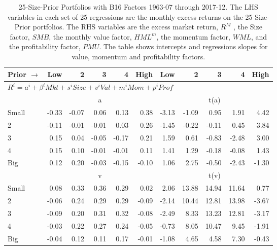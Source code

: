
\begin{table}[!ht]
\footnotesize
\centering
\caption{
\scriptsize{
25-Size-Prior Portfolios with B16 Factors 1963-07 through 2017-12.
The LHS variables in each set of 25 regressions are the monthly excess returns on the 25
Size-Prior portfolios. The RHS variables are the excess market return, $R^M$ , the Size
factor, $SMB$, the monthly value factor, $HML^m$, the momentum factor, $WML$, and the
profitability factor, $PMU$. The table shows intercepts and regressions slopes for value,
momentum and profitability factors.
}
}
\begin{tabular}{lrrrrrrrrrr}
  \toprule
    Prior $\rightarrow$ & Low & 2 & 3 & 4 & High & Low & 2 & 3 & 4 & High \\ 
  \midrule
  \multicolumn{11}{l}{$R^i=a^i+\beta^iMkt+s^iSize+v^iVal+m^iMom+p^iProf$} \\

  
    
      & \multicolumn{5}{c}{a} & \multicolumn{5}{c}{t(a)}
    
    \\
      \cmidrule(r){2-6} \cmidrule(r){7-11}

    Small   & -0.33  & -0.07  & 0.06  & 0.13  & 0.38  & -3.13  & -1.09  & 0.95  & 1.91  & 4.42  \\
         2  & -0.11  & -0.01  & -0.01  & 0.03  & 0.26  & -1.45  & -0.22  & -0.11  & 0.45  & 3.84  \\
         3  & 0.15  & 0.04  & -0.05  & -0.17  & 0.21  & 1.59  & 0.61  & -0.83  & -2.48  & 3.00  \\
         4  & 0.15  & 0.10  & -0.01  & -0.01  & 0.11  & 1.41  & 1.29  & -0.18  & -0.08  & 1.43  \\
    Big     & 0.12  & 0.20  & -0.03  & -0.15  & -0.10  & 1.06  & 2.75  & -0.50  & -2.43  & -1.30  \\

  
    
      & \multicolumn{5}{c}{v} & \multicolumn{5}{c}{t(v)}
    
    \\
      \cmidrule(r){2-6} \cmidrule(r){7-11}

    Small   & 0.08  & 0.33  & 0.36  & 0.29  & 0.02  & 2.06  & 13.88  & 14.94  & 11.64  & 0.77  \\
         2  & -0.06  & 0.24  & 0.29  & 0.29  & -0.09  & -2.14  & 10.44  & 12.81  & 13.98  & -3.67  \\
         3  & -0.09  & 0.20  & 0.31  & 0.32  & -0.08  & -2.49  & 8.33  & 13.23  & 12.81  & -3.17  \\
         4  & -0.03  & 0.22  & 0.27  & 0.24  & -0.05  & -0.73  & 8.05  & 10.47  & 9.45  & -1.91  \\
    Big     & -0.04  & 0.12  & 0.11  & 0.17  & -0.01  & -1.08  & 4.65  & 4.58  & 7.30  & -0.43  \\


\end{tabular}
\end{table}
